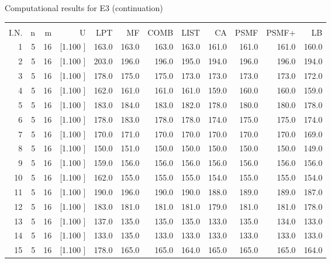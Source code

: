 \documentclass[12pt,a4paper]{article}
\begin{document}
\newpage
\begin{center}
 Computational results for E3 (continuation) {\tiny
\begin{tabular}{r r r r r r r r r r r r}\hline
    &   &   &          &        &        &        &        &        &        &        &       \\[-0.1in]
  I.N.  &  n  &  m  &  U  &  LPT  &  MF  &  COMB  &  LIST  &  CA  & PSMF &PSMF+ & LB \\[0.03in]
\hline
   1&  5& 16&[1.100     ]&   163.0&   163.0&   163.0&   163.0&   161.0&   161.0&   161.0&   160.0\\[-0.02in]
   2&  5& 16&[1.100     ]&   203.0&   196.0&   196.0&   195.0&   194.0&   196.0&   196.0&   194.0\\[-0.02in]
   3&  5& 16&[1.100     ]&   178.0&   175.0&   175.0&   173.0&   173.0&   173.0&   173.0&   172.0\\[-0.02in]
   4&  5& 16&[1.100     ]&   162.0&   161.0&   161.0&   161.0&   159.0&   160.0&   160.0&   159.0\\[-0.02in]
   5&  5& 16&[1.100     ]&   183.0&   184.0&   183.0&   182.0&   178.0&   180.0&   180.0&   178.0\\[-0.02in]
   6&  5& 16&[1.100     ]&   178.0&   183.0&   178.0&   178.0&   174.0&   175.0&   175.0&   174.0\\[-0.02in]
   7&  5& 16&[1.100     ]&   170.0&   171.0&   170.0&   170.0&   170.0&   170.0&   170.0&   169.0\\[-0.02in]
   8&  5& 16&[1.100     ]&   150.0&   151.0&   150.0&   150.0&   150.0&   150.0&   150.0&   149.0\\[-0.02in]
   9&  5& 16&[1.100     ]&   159.0&   156.0&   156.0&   156.0&   156.0&   156.0&   156.0&   156.0\\[-0.02in]
  10&  5& 16&[1.100     ]&   162.0&   155.0&   155.0&   155.0&   154.0&   155.0&   155.0&   154.0\\[-0.02in]
  11&  5& 16&[1.100     ]&   190.0&   196.0&   190.0&   190.0&   188.0&   189.0&   189.0&   187.0\\[-0.02in]
  12&  5& 16&[1.100     ]&   183.0&   181.0&   181.0&   181.0&   179.0&   181.0&   181.0&   178.0\\[-0.02in]
  13&  5& 16&[1.100     ]&   137.0&   135.0&   135.0&   135.0&   133.0&   135.0&   134.0&   133.0\\[-0.02in]
  14&  5& 16&[1.100     ]&   133.0&   135.0&   133.0&   133.0&   133.0&   133.0&   133.0&   133.0\\[-0.02in]
  15&  5& 16&[1.100     ]&   178.0&   165.0&   165.0&   164.0&   165.0&   165.0&   165.0&   164.0\\[-0.02in]

\end{tabular}}
\end{center}
\end{document}
